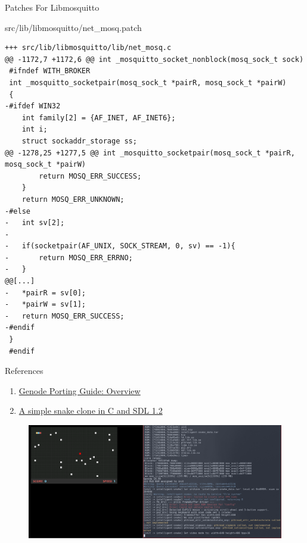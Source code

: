 \documentclass{beamer}
\begin{document}
  \begin{frame}[fragile]{Patches For Libmosquitto}
    \begin{block}{src/lib/libmosquitto/net\_mosq.patch}
      \begin{verbatim}
+++ src/lib/libmosquitto/lib/net_mosq.c
@@ -1172,7 +1172,6 @@ int _mosquitto_socket_nonblock(mosq_sock_t sock)
 #ifndef WITH_BROKER
 int _mosquitto_socketpair(mosq_sock_t *pairR, mosq_sock_t *pairW)
 {
-#ifdef WIN32
 	int family[2] = {AF_INET, AF_INET6};
 	int i;
 	struct sockaddr_storage ss;
@@ -1278,25 +1277,5 @@ int _mosquitto_socketpair(mosq_sock_t *pairR, mosq_sock_t *pairW)
 		return MOSQ_ERR_SUCCESS;
 	}
 	return MOSQ_ERR_UNKNOWN;
-#else
-	int sv[2];
-
-	if(socketpair(AF_UNIX, SOCK_STREAM, 0, sv) == -1){
-		return MOSQ_ERR_ERRNO;
-	}
@@[...]
-	*pairR = sv[0];
-	*pairW = sv[1];
-	return MOSQ_ERR_SUCCESS;
-#endif
 }
 #endif
      \end{verbatim}
    \end{block}
  \end{frame}

  \begin{frame}{References}
    \begin{enumerate}
      \item \href{https://genode.org/documentation/developer-resources/porting}{Genode Porting Guide: Overview}
      \item \href{https://github.com/prurigro/intelligent-snake}{A simple snake clone in C and SDL 1.2}
    \end{enumerate}

    \begin{figure}
      \includegraphics[scale=0.15]{img/isnake.png}
    \end{figure}
  \end{frame}
\end{document}
